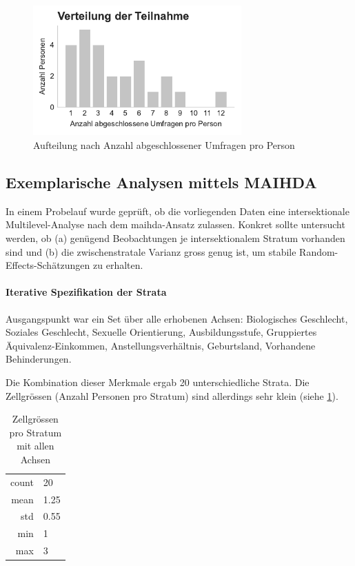 \begin{figure}[htbp]
    \centering
    \includegraphics[width=8cm]{analysis/plots/survey_counts.pdf}
    \caption{Aufteilung nach Anzahl abgeschlossener Umfragen pro Person}
    \label{fig:survey_counts}
\end{figure}


\subsection*{Exemplarische Analysen mittels MAIHDA}
\label{sec:pilot_maihda}

In einem Probelauf wurde geprüft, ob die vorliegenden Daten eine intersektionale Multilevel-Analyse nach dem \gls{maihda}-Ansatz zulassen. Konkret sollte untersucht werden, ob (a) genügend Beobachtungen je intersektionalem Stratum vorhanden sind und (b) die zwischenstratale Varianz gross genug ist, um stabile Random-Effects-Schätzungen zu erhalten.

\paragraph{Iterative Spezifikation der Strata}
Ausgangspunkt war ein Set über alle erhobenen Achsen: Biologisches Geschlecht, Soziales Geschlecht, Sexuelle Orientierung, Ausbildungsstufe, Gruppiertes Äquivalenz-Einkommen, Anstellungsverhältnis, Geburtsland, Vorhandene Behinderungen.

Die Kombination dieser Merkmale ergab 20 unterschiedliche Strata. Die Zellgrössen (Anzahl Personen pro Stratum) sind allerdings sehr klein (siehe \cref{tab:zellgroessen_alle_achsen}).

\begin{table}[h]
    \centering
    \begin{tabular}{rl}
        count & 20 \\
        mean & 1.25 \\
        std & 0.55 \\
        min & 1 \\
        max & 3 \\
    \end{tabular}
    \caption{Zellgrössen pro Stratum mit allen Achsen}
    \label{tab:zellgroessen_alle_achsen}
\end{table}

